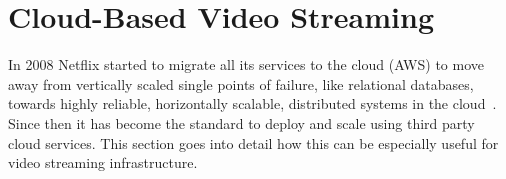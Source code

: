     
    
    

\section{Cloud-Based Video Streaming}

In 2008 Netflix started to migrate all its services to the cloud (\ac{AWS}) to move away from vertically scaled single points of failure, like relational databases, towards highly reliable, horizontally scalable, distributed systems in the cloud~\parencite{netflix_aws}. Since then it has become the standard to deploy and scale using third party cloud services. This section goes into detail how this can be especially useful for video streaming infrastructure. 

